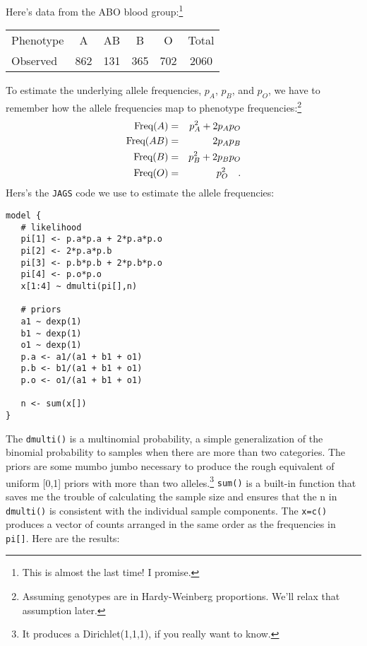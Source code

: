 \documentclass[12pt]{article}
\begin{document}
Here's data from the ABO blood group:\footnote{This is almost the last
time! I promise.}
\begin{center}
\begin{tabular}{l|ccccc}
\hline\hline
Phenotype &   A &  AB &   B &   O & Total \\
Observed  & 862 & 131 & 365 & 702 & 2060 \\
\hline
\end{tabular}
\end{center}
To estimate the underlying allele frequencies, $p_A$, $p_B$, and
$p_O$, we have to remember how the allele frequencies map to phenotype
frequencies:\footnote{Assuming genotypes are in Hardy-Weinberg
  proportions. We'll relax that assumption later.}
\begin{eqnarray*}
\hbox{Freq}(A) &=& p_A^2 + 2p_Ap_O \\
\hbox{Freq}(AB) &=& 2p_Ap_B \\
\hbox{Freq}(B) &=& p_B^2 + 2p_Bp_O \\
\hbox{Freq}(O) &=& p_O^2 \quad .
\end{eqnarray*}
Hers's the {\tt JAGS} code we use to estimate the allele
frequencies:
\begin{verbatim}
model {
   # likelihood
   pi[1] <- p.a*p.a + 2*p.a*p.o
   pi[2] <- 2*p.a*p.b
   pi[3] <- p.b*p.b + 2*p.b*p.o
   pi[4] <- p.o*p.o
   x[1:4] ~ dmulti(pi[],n)

   # priors
   a1 ~ dexp(1)
   b1 ~ dexp(1)
   o1 ~ dexp(1)
   p.a <- a1/(a1 + b1 + o1)
   p.b <- b1/(a1 + b1 + o1)
   p.o <- o1/(a1 + b1 + o1)

   n <- sum(x[])
}
\end{verbatim}
The {\tt dmulti()} is a multinomial probability, a simple
generalization of the binomial probability to samples when there are
more than two categories. The priors are some mumbo jumbo necessary to
produce the rough equivalent of uniform [0,1] priors with more than
two alleles.\footnote{It produces a Dirichlet(1,1,1), if you really
  want to know.} {\tt sum()} is a built-in function that saves me the
trouble of calculating the sample size and ensures that the n in {\tt
  dmulti()} is consistent with the individual sample components. The
{\tt x=c()} produces a vector of counts arranged in the same order as
the frequencies in {\tt pi[]}. Here are the results:
\end{document}
